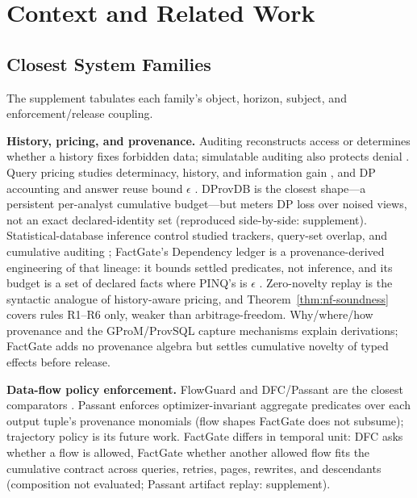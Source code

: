 \documentclass[10pt,journal,compsoc]{IEEEtran}
\newcommand{\system}{FactGate\xspace}
\begin{document}
\section{Context and Related Work}
\label{sec:related}

\subsection{Closest System Families}

The supplement tabulates each family's object, horizon, subject, and
enforcement/release coupling.

\textbf{History, pricing, and provenance.} Auditing reconstructs access or
determines whether a history fixes forbidden data; simulatable auditing
also protects denial
\cite{agrawal2004hippocratic,motwani2008auditing,kenthapadi2005simulatable}.
Query pricing studies determinacy, history, and information gain
\cite{koutris2012query,deep2017qirana,peng2025aria}, and DP accounting and answer
reuse bound $\epsilon$ \cite{dwork2014foundations,mazmudar2022cachedp}.
DProvDB \cite{zhang2023dprovdb} is the closest shape---a persistent
per-analyst cumulative budget---but meters DP loss over noised views, not
an exact declared-identity set (reproduced side-by-side: supplement).
Statistical-database inference control studied trackers, query-set overlap,
and cumulative auditing
\cite{dobkin1979secure,denning1980tracker,nabar2006robustness};
\system's Dependency ledger is a provenance-derived engineering of that
lineage: it bounds settled predicates, not inference, and its budget is a
set of declared facts where PINQ's is $\epsilon$ \cite{mcsherry2009pinq}. Zero-novelty replay is the
syntactic analogue of history-aware pricing, and
Theorem~\ref{thm:nf-soundness} covers rules R1--R6 only, weaker than
arbitrage-freedom. Why/where/how provenance
\cite{buneman2001why,green2007provenance,cheney2009provenance,amsterdamer2011aggregate}
and the GProM/ProvSQL capture mechanisms
\cite{arab2018gprom,senellart2018provsql,sen2026provsql} explain derivations;
\system adds no provenance algebra but settles cumulative novelty of typed
effects before release.

\textbf{Data-flow policy enforcement.} FlowGuard and DFC/Passant are the
closest comparators \cite{summers2026dataflow,summers2026passant}.
Passant enforces optimizer-invariant aggregate predicates over each output
tuple's provenance monomials (flow shapes \system does not subsume);
trajectory policy is its future work. \system differs in temporal unit: DFC asks whether a flow is
allowed, \system whether another allowed flow fits the cumulative contract
across queries, retries, pages, rewrites, and descendants (composition not
evaluated; Passant artifact replay: supplement).
\end{document}
